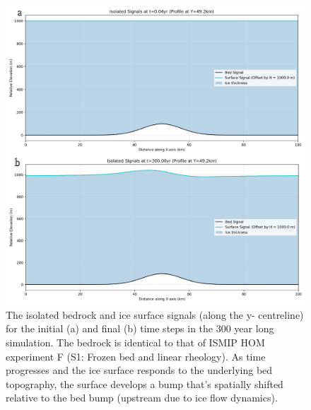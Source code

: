 \begin{figure}[H]
    \includegraphics[scale=0.30]{figures/S1_F_signals.pdf}
    \caption{The isolated bedrock and ice surface signals (along the y- centreline) for the initial (a) and final (b) time steps in the 300 year long simulation. The bedrock is identical to that of ISMIP HOM experiment F (S1: Frozen bed and linear rheology). As time progresses and the ice surface responds to the underlying bed topography, the surface develops a bump that's spatially shifted relative to the bed bump (upstream due to ice flow dynamics).}
    \label{fig:phase_analysis_Signals}
\end{figure}
